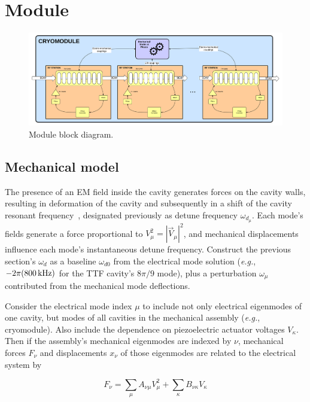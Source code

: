 \documentclass[a4paper,12pt]{article}
\begin{document}
\newpage

\section{Module}

\begin{figure}
\centering
\includegraphics[scale=0.3]{../figures/Cryomodule_block_diagram.png}
\caption{Module block diagram.}
\label{fig:Module_block_diagram}
\end{figure}

\subsection{Mechanical model}

The presence of an EM field inside the cavity generates forces on the cavity walls, resulting in deformation of the cavity and subsequently in a shift of the cavity resonant frequency~\cite{ref:delayen}, designated previously as detune frequency $\omega_{d_\mu}$. Each mode's fields generate a force proportional to $V_\mu^2 = |\vec V_\mu|^2$, and mechanical displacements influence each mode's instantaneous detune frequency.  Construct the previous section's $\omega_d$ as
a baseline $\omega_{d0}$ from the electrical mode solution ({\it e.g.}, $-2\pi (800\thinspace {\rm kHz})$ for the TTF cavity's $8\pi/9$ mode), plus a perturbation $\omega_{\mu}$ contributed from the mechanical mode deflections. 

Consider the electrical mode index $\mu$ to include not only electrical eigenmodes of one cavity, but modes of all cavities in the mechanical assembly ({\it e.g.}, cryomodule). Also include the dependence on piezoelectric actuator voltages $V_\kappa$. Then if the assembly's mechanical eigenmodes are indexed by $\nu$, mechanical forces $F_\nu$ and displacements $x_\nu$ of those eigenmodes are related to the electrical system by

\begin{equation}
F_\nu = \sum_\mu A_{\nu\mu} V_\mu^2 + \sum_\kappa B_{\nu\kappa}V_\kappa
\end{equation}
\end{document}
